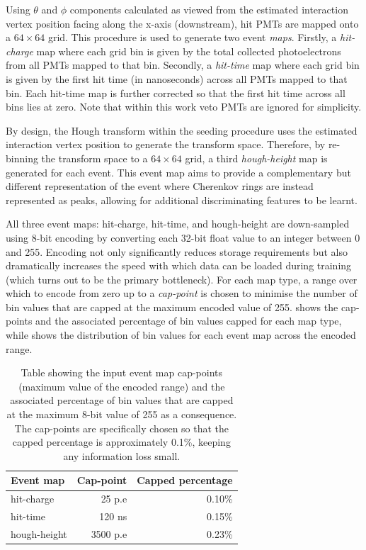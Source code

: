 Using $\theta$ and $\phi$ components calculated as viewed from the estimated interaction vertex
position facing along the x-axis (downstream), hit PMTs are mapped onto a $64 \times 64$ grid.
This procedure is used to generate two event \emph{maps}. Firstly, a \emph{hit-charge} map where
each grid bin is given by the total collected photoelectrons from all PMTs mapped to that bin.
Secondly, a \emph{hit-time} map where each grid bin is given by the first hit time (in
nanoseconds) across all PMTs mapped to that bin. Each hit-time map is further corrected so that
the first hit time across all bins lies at zero. Note that within this work veto PMTs are ignored
for simplicity.

By design, the Hough transform within the seeding procedure uses the estimated interaction vertex
position to generate the transform space. Therefore, by re-binning the transform space to a $64
\times 64$ grid, a third \emph{hough-height} map is generated for each event. This event map aims
to provide a complementary but different representation of the event where Cherenkov rings are
instead represented as peaks, allowing for additional discriminating features to be learnt.

All three event maps: hit-charge, hit-time, and hough-height are down-sampled using 8-bit encoding
by converting each 32-bit float value to an integer between 0 and 255. Encoding not only
significantly reduces storage requirements but also dramatically increases the speed with which
data can be loaded during training (which turns out to be the primary bottleneck). For each map
type, a range over which to encode from zero up to a \emph{cap-point} is chosen to minimise the
number of bin values that are capped at the maximum encoded value of 255. 
shows the cap-points and the associated percentage of bin values capped for each map type, while
 shows the distribution of bin values for each event map across
the encoded range.

\begin{table}
    \begin{tabular}{lrr}
        Event map    & Cap-point & Capped percentage \\
        \midrule
        hit-charge   & 25 p.e    & 0.10\%            \\
        hit-time     & 120 ns    & 0.15\%            \\
        hough-height & 3500 p.e  & 0.23\%            \\
    \end{tabular}
    \caption[Table of input event map 8-bit cap-points and percentages]
    {Table showing the input event map cap-points (maximum value of the encoded range) and the
        associated percentage of bin values that are capped at the maximum 8-bit value of 255 as a
        consequence. The cap-points are specifically chosen so that the capped percentage is
        approximately 0.1\%, keeping any information loss small.}
    \label{tab:encoding}
\end{table}

